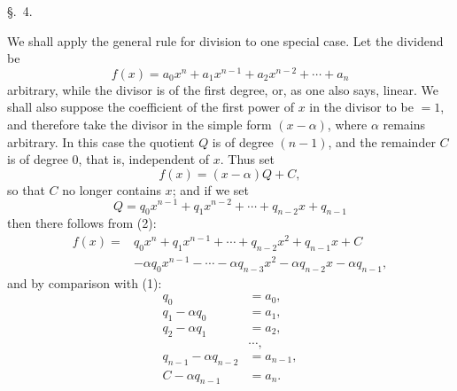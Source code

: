 
\begingroup
\setlength{\abovedisplayskip}{5pt plus 2pt minus 1pt}
\setlength{\belowdisplayskip}{5pt plus 2pt minus 1pt}
\setlength{\abovedisplayshortskip}{3pt plus 1pt}
\setlength{\belowdisplayshortskip}{4pt plus 1pt}
\linespread{0.94}\selectfont

\begin{center}
{\large \S.\ 4.}

\vspace{0.5em}
{\large{}}
\end{center}

We shall apply the general rule for division to one special case. Let
the dividend be
\begin{equation}
 f(x)=a_0x^n+a_1x^{n-1}+a_2x^{n-2}+\cdots+a_n
\tag{1}
\end{equation}
arbitrary, while the divisor is of the first degree, or, as one also
says, linear. We shall also suppose the coefficient of the first power
of $x$ in the divisor to be $=1$, and therefore take the divisor in the
simple form $(x-\alpha)$, where $\alpha$ remains arbitrary. In this
case the quotient $Q$ is of degree $(n-1)$, and the remainder $C$ is of
degree $0$, that is, independent of $x$. Thus set
\begin{equation}
 f(x)=(x-\alpha)Q+C,
\tag{2}
\end{equation}
so that $C$ no longer contains $x$; and if we set
\begin{equation}
 Q=q_0x^{n-1}+q_1x^{n-2}+\cdots+q_{n-2}x+q_{n-1}
\tag{3}
\end{equation}
then there follows from (2):
\begin{equation}
\begin{aligned}
 f(x)={}&q_0x^n+q_1x^{n-1}+\cdots+q_{n-2}x^2+q_{n-1}x+C\\
 &-\alpha q_0x^{n-1}-\cdots-\alpha q_{n-3}x^2
   -\alpha q_{n-2}x-\alpha q_{n-1},
\end{aligned}
\tag{4}
\end{equation}
and by comparison with (1):
\begin{equation}
\begin{aligned}
 q_0&=a_0,\\
 q_1-\alpha q_0&=a_1,\\
 q_2-\alpha q_1&=a_2,\\
 &\cdots,\\
 q_{n-1}-\alpha q_{n-2}&=a_{n-1},\\
 C-\alpha q_{n-1}&=a_n.
\end{aligned}
\tag{5}
\end{equation}
